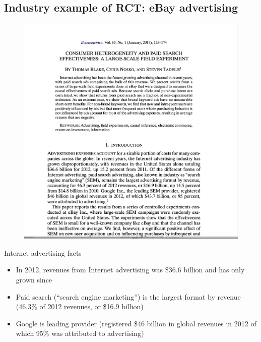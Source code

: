 \documentclass{beamer}
\begin{document}
\subsection{Industry example of RCT: eBay advertising}

\begin{frame}

\begin{figure}[hpt]
\begin{center}
\includegraphics[scale=0.25]{./lecture_includes/econometrica_steve.png}
\end{center}
\end{figure}

\end{frame}

\begin{frame}{Internet advertising facts}

\begin{itemize}
\item In 2012, revenues from Internet advertising was \$36.6 billion and has only grown since
\item Paid search (``search engine marketing'') is the largest format by revenue (46.3\% of 2012 revenues, or \$16.9 billion)
\item Google is leading provider (registered \$46 billion in global revenues in 2012 of which 95\% was attributed to advertising)
\end{itemize}

\end{frame}
\end{document}
